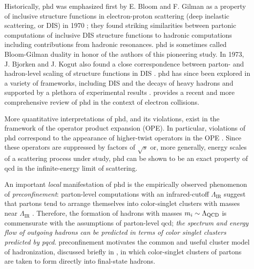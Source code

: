 Historically, \gls{phd} was emphasized first by E. Bloom and F. Gilman as a property of inclusive structure functions in electron-proton scattering (deep inelastic scattering, or DIS) in 1970 \cite{PhysRevLett.25.1140};
%
they found striking similarities between partonic computations of inclusive DIS structure functions to hadronic computations including contributions from hadronic resonances.
%
\gls{phd} is sometimes called Bloom-Gilman duality in honor of the authors of this pioneering study.
%
In 1973, J. Bjorken and J. Kogut also found a close correspondence between parton- and hadron-level scaling of structure functions in DIS \cite{Bjorken:1973gc}.
%
\Gls{phd} has since been explored in a variety of frameworks, including DIS \cite{Georgi:1976ve,Liuti:2011rw} and the decays of heavy hadrons \cite{Bigi:2002fj} and supported by a plethora of experimental results \cite{Niculescu:2000tk,Niculescu:2000tj,Navasardyan:2006gv,JeffersonLabE00-115:2009jll,Malace:2009dg}.
%
 provides a recent and more comprehensive review of \gls{phd} in the context of electron collisions.




More quantitative interpretations of \gls{phd}, and its violations, exist in the framework of the operator product expansion (OPE).
%
In particular, violations of \gls{phd} correspond to the appearance of higher-twist operators in the OPE \cite{DeRujula:1976baf}.
%
Since these operators are suppressed by factors of \(\sqrt{s}\) or, more generally, energy scales of a scattering process under study, \gls{phd} can be shown to be an exact property of \gls{qcd} in the infinite-energy limit of scattering.


An important \textit{local} manifestation of \gls{phd} is the empirically observed phenomenon of \textit{\gls{preconfinement}}:
%
parton-level computations with an infrared-cutoff \(\Lambda_\text{IR}\) suggest that partons tend to arrange themselves into color-singlet clusters with masses near \(\Lambda_\text{IR}\) \cite{Amati:1979fg,Marchesini:1980cr,Catani:1990rr}.
%
Therefore, the formation of hadrons with masses \(m_i \sim \Lambda_{\mathrm{QCD}}\) is commensurate with the assumptions of parton-level \gls{qcd};
%
\textit{the spectrum and energy flow of outgoing hadrons can be predicted in terms of color singlet clusters predicted by \gls{pqcd}}.
%
\Gls{preconfinement} motivates the common and useful cluster model of hadronization, discussed briefly in , in which color-singlet clusters of partons are taken to form directly into final-state hadrons.


